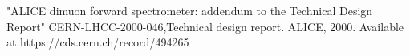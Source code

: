 "ALICE dimuon forward spectrometer: addendum to the
Technical Design Report" CERN-LHCC-2000-046,Technical design report. ALICE, 2000. Available at https://cds.cern.ch/record/494265
